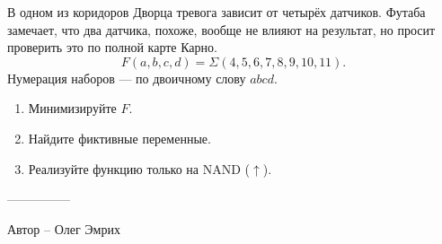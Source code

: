 \question
В одном из коридоров Дворца тревога зависит от четырёх датчиков. Футаба замечает, что два датчика, похоже, вообще не влияют на результат, но просит проверить это по полной карте Карно.
\[
F(a,b,c,d)=\Sigma(4,5,6,7,8,9,10,11).
\]
Нумерация наборов --- по двоичному слову $abcd$.
\begin{enumerate}
\item Минимизируйте $F$.
\item Найдите фиктивные переменные.
\item Реализуйте функцию только на NAND ($\uparrow$).
\end{enumerate}

---------------

Автор -- Олег Эмрих
